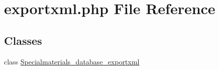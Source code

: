 \hypertarget{exportxml_8php}{\section{exportxml.\+php File Reference}
\label{exportxml_8php}
}
\subsection*{Classes}
\begin{DoxyCompactItemize}
\item 
class \hyperlink{classSpecialmaterials__database__exportxml}{Specialmaterials\+\_\+database\+\_\+exportxml}
\end{DoxyCompactItemize}
